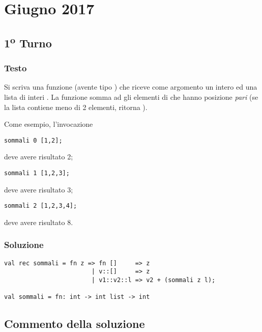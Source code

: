 \section{Giugno 2017}

\subsection{1\textsuperscript{o} Turno}

\subsubsection{Testo}

Si scriva una funzione  (avente tipo ) che riceve come argomento un intero  ed una lista di interi .
La funzione  somma ad  gli elementi di  che hanno posizione \emph{pari} (se la lista contiene meno di 2 elementi,  ritorna ).

\medskip
Come esempio, l'invocazione

\begin{lstlisting}
sommali 0 [1,2];
\end{lstlisting}

deve avere risultato 2;

\begin{lstlisting}
sommali 1 [1,2,3];
\end{lstlisting}

deve avere risultato 3;

\begin{lstlisting}
sommali 2 [1,2,3,4];
\end{lstlisting}

deve avere risultato 8.

\subsubsection{Soluzione}

\begin{lstlisting}[style = SML, caption = {[Definizione della funzione \sml{sommali} - 1\textsuperscript{o} Turno]Definizione della funzione \sml{sommali}}]
val rec sommali = fn z => fn []     => z
						| v::[]     => z
						| v1::v2::l => v2 + (sommali z l);

val sommali = fn: int -> int list -> int
\end{lstlisting}

\subsection{Commento della soluzione}

